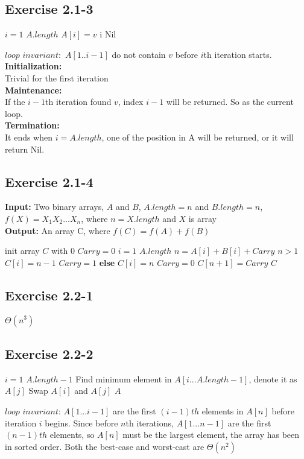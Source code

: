\documentclass[12pt]{article}
\theoremstyle{definition}
\theoremstyle{remark}
\begin{document}
\subsection*{Exercise 2.1-3}
\begin{codebox}
\li \For $i = 1$ \To $A.length$ \label{li:for}
\li \quad \If $A[i] = v$ \label{li:if}
\li \qquad \Return i
\li \Return Nil
\end{codebox}
$loop$ $invariant:$ $A[1..i-1]$ do not contain $v$ before $i$th iteration starts.
\textbf{Initialization:}\\Trivial for the first iteration\\
\textbf{Maintenance:}\\If the $i-1$th iteration found $v$, index $i-1$ will be returned. So as the current loop.\\
\textbf{Termination:}\\It ends when $i = A.length$, one of the position in A will be returned, or it will return Nil.
\subsection*{Exercise 2.1-4}
\textbf{Input:} Two binary arrays, $A$ and $B$, $A.length = n$ and $B.length = n$, $f(X) = X_1X_2...X_n$, where $n = X.length$ and $X$ is array\\
\textbf{Output:} An array C, where $f(C) = f(A) + f(B)$
\begin{codebox}
\li init array $C$ with $0$
\li $Carry = 0$
\li \For $i = 1$ \To $A.length$ \label{li:for}
\li \quad $n = A[i] + B[i] + Carry$
\li \quad \If $n > 1$ \label{li:if}
\li \qquad $C[i] = n - 1$
\li \qquad $Carry = 1$
\li \quad \textbf{else}
\li \qquad $C[i] = n$
\li \qquad $Carry = 0$
\li $C[n+1] = Carry$
\li \Return $C$
\end{codebox}
\subsection*{Exercise 2.2-1}
$\Theta(n^3)$
\subsection*{Exercise 2.2-2}
\begin{codebox}
\li \For $i = 1$ \To $A.length-1$ \label{li:for}
\li \quad Find minimum element in $A[i...A.length-1]$, denote it as $A[j]$
\li \quad Swap $A[i]$ and $A[j]$
\li \Return $A$
\end{codebox}
$loop$ $invariant$: $A[1...i-1]$ are the first $(i-1)th$ elements in $A[n]$ before iteration $i$ begins. Since before $n$th iterations, $A[1...n-1]$ are the first $(n-1)th$ elements, so $A[n]$ must be the largest element, the array has been in sorted order. Both the best-case and worst-cast are $\Theta(n^2)$
\end{document}
